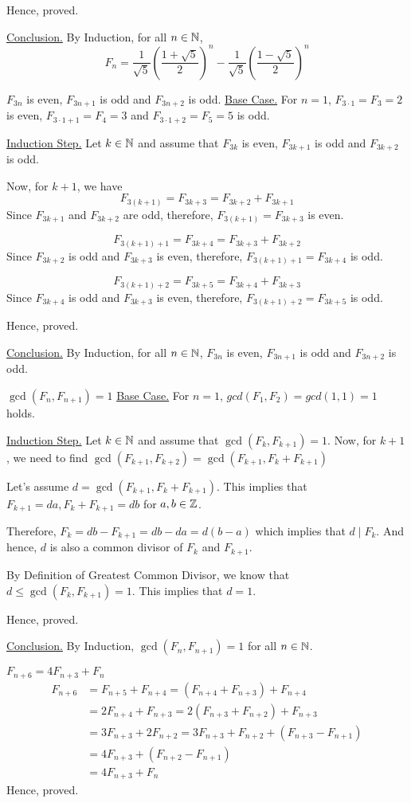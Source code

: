	Hence, proved.

	\underline{Conclusion.} By Induction, for all $n \in \mathbb{N}$,
	$$F_n = \frac{1}{\sqrt{5}} \left( \frac{1+\sqrt{5}}{2} \right)^n 
				- \frac{1}{\sqrt{5}} \left( \frac{1-\sqrt{5}}{2} \right)^n$$
	\es


\item $F_{3n}$ is even, $F_{3n+1}$ is odd and $F_{3n+2}$ is odd.
	\bs
	\underline{Base Case.} For $n = 1$, $F_{3 \cdot 1} = F_3 = 2$ is even, $F_{3 \cdot 1 + 1} = F_4 = 3$ and $F_{3 \cdot 1 + 2} = F_5 = 5$ is odd.
	
	\underline{Induction Step.} Let $k \in \mathbb{N}$ and assume that $F_{3k}$ is even, $F_{3k+1}$ is odd and $F_{3k+2}$ is odd.

	Now, for $k+1$, we have
	$$F_{3(k+1)} = F_{3k+3} = F_{3k+2} + F_{3k+1}$$
		Since $F_{3k+1}$ and $F_{3k+2}$ are odd, therefore, $F_{3(k+1)} = F_{3k+3}$ is even.

	$$F_{3(k+1)+1} = F_{3k+4} = F_{3k+3} + F_{3k+2}$$
	Since $F_{3k+2}$ is odd and $F_{3k+3}$ is even, therefore, $F_{3(k+1)+1} = F_{3k+4}$ is odd.

	$$F_{3(k+1)+2} = F_{3k+5} = F_{3k+4} + F_{3k+3}$$
	Since $F_{3k+4}$ is odd and $F_{3k+3}$ is even, therefore, $F_{3(k+1)+2} = F_{3k+5}$ is odd.

	Hence, proved.

	\underline{Conclusion.} By Induction, for all $n \in \mathbb{N}$, $F_{3n}$ is even, $F_{3n+1}$ is odd and $F_{3n+2}$ is odd.
	\es

\item $\gcd(F_n, F_{n+1}) = 1$
	\bs
	\underline{Base Case.} For $n = 1$, $gcd(F_1, F_2) = gcd(1, 1) = 1$ holds.
	
	\underline{Induction Step.} Let $k \in \mathbb{N}$ and assume that $\gcd(F_k, F_{k+1}) = 1$. Now, for $k+1$, we need to find $\gcd(F_{k+1}, F_{k+2}) = \gcd(F_{k+1}, F_k + F_{k+1})$

	Let's assume $d = \gcd(F_{k+1}, F_k + F_{k+1})$. This implies that
	$F_{k+1} = da, F_k + F_{k+1} = db$ for $a, b \in \mathbb{Z}$. 

	Therefore, $F_k = db - F_{k+1} = db-da = d(b-a)$ which implies that $d \mid F_k$. And hence, $d$ is also a common divisor of $F_k$ and $F_{k+1}$.

	By Definition of Greatest Common Divisor, we know that $d \leq \gcd(F_k, F_{k+1}) = 1$. This implies that $d = 1$.

	Hence, proved.

	\underline{Conclusion.} By Induction, $\gcd(F_n, F_{n+1}) = 1$ for all $n \in \mathbb{N}$.
	\es

\item $F_{n+6} = 4F_{n+3} + F_n$
	\bs
	\begin{align*}
		F_{n+6} &= F_{n+5} + F_{n+4} = (F_{n+4} + F_{n+3}) + F_{n+4} \\
						&= 2F_{n+4} + F_{n+3} = 2(F_{n+3} + F_{n+2}) + F_{n+3} \\
						&= 3F_{n+3} + 2F_{n+2} 
						= 3F_{n+3} + F_{n+2} + (F_{n+3} - F_{n+1}) \\
						&= 4F_{n+3} + (F_{n+2} - F_{n+1}) \\
						&= 4F_{n+3} + F_{n}
	\end{align*}
	Hence, proved.
	\es
\enum
\ep
